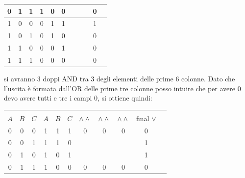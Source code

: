 \documentclass[a4paper,12pt, oneside]{book}
\begin{document}
\begin{esercizio}
\begin{center}
\begin{tabular}{|c|c|c|c|c|c|c|c|c|c|c|}
			\hline
			0   & 1   & 1   & 1              & 0              & 0              &                  &                  &                 & 0            \\
			\hline
			1   & 0   & 0   & 0              & 1              & 1              &                  &                  &                 & 1            \\
			\hline
			1   & 0   & 1   & 0              & 1              & 0              &                  &                  &                 & 0            \\
			\hline
			1   & 1   & 0   & 0              & 0              & 1              &                  &                  &                 & 0            \\
			\hline
			1   & 1   & 1   & 0              & 0              & 0              &                  &                  &                 & 0            \\
			\hline
		\end{tabular}
	\end{center}
	si avranno 3 doppi AND tra 3 degli elementi delle prime 6 colonne. Dato che l'uscita è formata dall'OR delle prime tre colonne posso intuire che per avere 0 devo avere tutti e tre i campi 0, si ottiene quindi:
	\begin{center}
		\begin{tabular}{|c|c|c|c|c|c|c|c|c|c|c|}
			\hline
			    &     &     &                &                &                &                  &                  &                 &              \\
			$A$ & $B$ & $C$ & $\overline{A}$ & $\overline{B}$ & $\overline{C}$ & $\wedge \wedge $ & $\wedge \wedge $ & $\wedge \wedge$ & final $\vee$ \\
			\hline
			0   & 0   & 0   & 1              & 1              & 1              & 0                & 0                & 0               & 0            \\
			\hline
			0   & 0   & 1   & 1              & 1              & 0              &                  &                  &                 & 1            \\
			\hline
			0   & 1   & 0   & 1              & 0              & 1              &                  &                  &                 & 1            \\
			\hline
			0   & 1   & 1   & 1              & 0              & 0              & 0                & 0                & 0               & 0            \\
			\hline

\end{tabular}
\end{center}
\end{esercizio}
\end{document}
